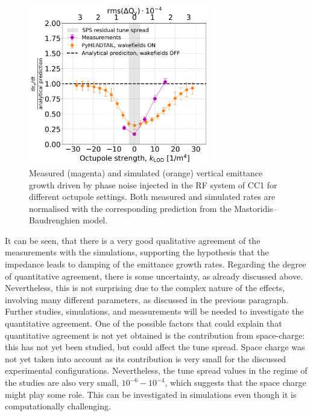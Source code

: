 \begin{figure}[!h]
   \centering         
   \includegraphics[width=0.7\textwidth]{images/Ch8/deyRates_sps_270GeV_PN1e-8_400MHz_SPS_NewWakesAllcontributions_appendWakes_y-plane_WakesONvsOFF_QpxQpy1_6D_Nb5e5_intensity3e10Scan_simulations_vs_measurements_magenta_new_legend.png}
       \caption{Measured (magenta) and simulated (orange) vertical emittance growth driven by phase noise injected in the RF system of CC1 for different octupole settings. Both measured and simulated rates are normalised with the corresponding prediction from the Mastoridis--Baudrenghien model.}
       \label{fig:cc_md_2022_measurement_vs_pyheadtail_simualtion}
\end{figure}

It can be seen, that there is a very good qualitative agreement of the measurements with the simulations, supporting the hypothesis that the impedance leads to damping of the emittance growth rates. Regarding the degree of quantitative agreement, there is some uncertainty, as already discussed above. Nevertheless, this is not surprising due to the complex nature of the effects, involving many different parameters, as discussed in the previous paragraph. Further studies, simulations, and measurements will be needed to investigate the quantitative agreement. One of the possible factors that could explain that quantitative agreement is not yet obtained is the contribution from space-charge: this has not yet been studied, but could affect the tune spread. Space charge was not yet taken into account as its contribution is very small for the discussed experimental configurations. Nevertheless, the tune spread values in the regime of the studies are also very small, $10^{-6}-10^{-4}$, which suggests that the space charge might play some role. This can be investigated in simulations even though it is computationally challenging.

